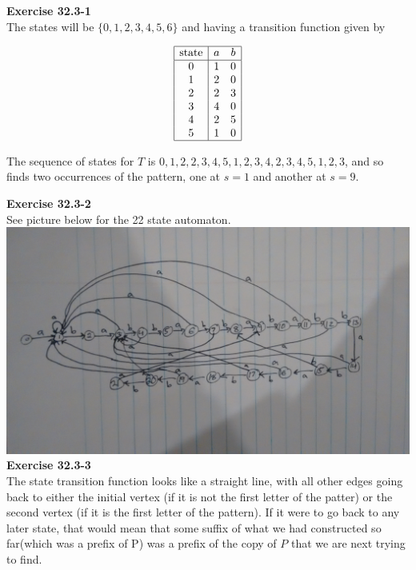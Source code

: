 \documentclass{article}
\begin{document}
\noindent\textbf{Exercise 32.3-1}\\

The states will be $\{0,1,2,3,4,5,6\}$ and having a transition function given by

\[
\begin{array}{|c|cc|}
\hline
\hbox{state}&a&b\\
\hline
0&1&0\\
1&2&0\\
2&2&3\\
3&4&0\\
4&2&5\\
5&1&0\\
\hline
\end{array}
\]

The sequence of states for $T$ is $0,1,2,2,3,4,5,1,2,3,4,2,3,4,5,1,2,3$, and so finds two occurrences of the pattern, one at $s=1$ and another at $s= 9$.

\noindent\textbf{Exercise 32.3-2}\\

See picture below for the 22 state automaton.\\

\includegraphics[scale=.1]{automaton.jpg}\\

\noindent\textbf{Exercise 32.3-3}\\

The state transition function looks like a straight line, with all other edges going back to either the initial vertex (if it is not the first letter of the patter) or the second vertex (if it is the first letter of the pattern). If it were to go back to any later state, that would mean that some suffix of what we had constructed so far(which was a prefix of P) was a prefix of the copy of $P$ that we are next trying to find.\\
\end{document}
